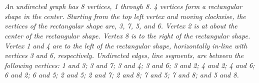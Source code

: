 \documentclass{amsart}
\theoremstyle{definition}
\theoremstyle{Exercise}
\theoremstyle{remark}
\theoremstyle{rule}
\numberwithin{equation}{section}
\begin{document}
\begin{enumerate}[label=(\alph*)]
\begin{enumerate}[label=(\roman*)]
\\\\
{\color{blue}{\bf Figure 8:} \emph{An undirected graph has 8 vertices, 1 through 8. 4 vertices form a rectangular shape in the center. Starting from the top left vertex and moving clockwise, the vertices of the rectangular shape are, 3, 7, 5, and 6. Vertex 2 is at about the center of the rectangular shape. Vertex 8 is to the right of the rectangular shape. Vertex 1 and 4 are to the left of the rectangular shape, horizontally in-line with vertices 3 and 6, respectively. Undirected edges, line segments, are between the following vertices: 1 and 3; 3 and 7; 3 and 4; 3 and 6; 3 and 2; 4 and 2; 4 and 6; 6 and 2; 6 and 5; 2 and 5; 2 and 7; 2 and 8; 7 and 5; 7 and 8; and 5 and 8. 
\\
}
}
\\
\\
\\\\
    \end{enumerate}
\end{enumerate}



 \newpage
 
\end{document}
